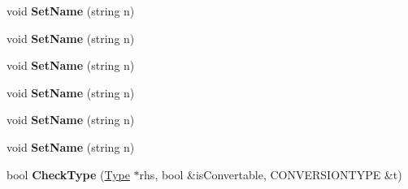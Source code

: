 \begin{DoxyCompactItemize}
\item 
\hypertarget{classType_ab8d2328a3a76289edf42b9bf0d4f278f}{void {\bfseries Set\-Name} (string n)}\label{classType_ab8d2328a3a76289edf42b9bf0d4f278f}

\item 
\hypertarget{classType_ab8d2328a3a76289edf42b9bf0d4f278f}{void {\bfseries Set\-Name} (string n)}\label{classType_ab8d2328a3a76289edf42b9bf0d4f278f}

\item 
\hypertarget{classType_ab8d2328a3a76289edf42b9bf0d4f278f}{void {\bfseries Set\-Name} (string n)}\label{classType_ab8d2328a3a76289edf42b9bf0d4f278f}

\item 
\hypertarget{classType_ab8d2328a3a76289edf42b9bf0d4f278f}{void {\bfseries Set\-Name} (string n)}\label{classType_ab8d2328a3a76289edf42b9bf0d4f278f}

\item 
\hypertarget{classType_ab8d2328a3a76289edf42b9bf0d4f278f}{void {\bfseries Set\-Name} (string n)}\label{classType_ab8d2328a3a76289edf42b9bf0d4f278f}

\item 
\hypertarget{classType_ab8d2328a3a76289edf42b9bf0d4f278f}{void {\bfseries Set\-Name} (string n)}\label{classType_ab8d2328a3a76289edf42b9bf0d4f278f}

\item 
\hypertarget{classType_a2574b17ddc03d5ca13309811d06f1a56}{bool {\bfseries Check\-Type} (\hyperlink{classType}{Type} $\ast$rhs, bool \&is\-Convertable, C\-O\-N\-V\-E\-R\-S\-I\-O\-N\-T\-Y\-P\-E \&t)}\label{classType_a2574b17ddc03d5ca13309811d06f1a56}

\end{DoxyCompactItemize}
